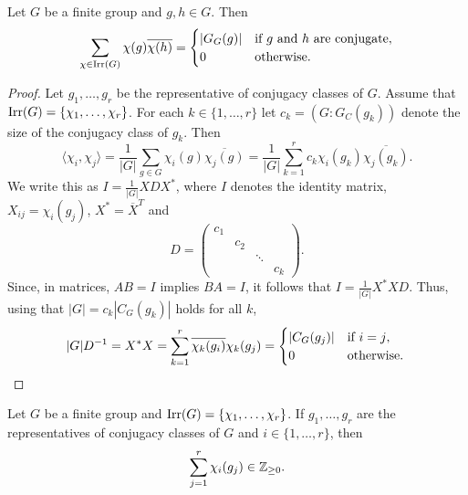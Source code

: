 \begin{theorem}[Schur]
    Let $G$ be a finite group and $g,h\in G$. 
    Then
    \[
    \sum_{\chi\in\operatorname{Irr}(G)}\chi(g)\overline{\chi(h)}
    =\begin{cases}
    |G_G(g)| & \text{if $g$ and $h$ are conjugate},\\
    0 & \text{otherwise}.
    \end{cases}
    \]
\end{theorem}

\begin{proof}
    Let $g_1,\dots,g_r$ be the representative of conjugacy classes of $G$. 
    Assume that $\operatorname{Irr}(G)=\{\chi_1,\dots,\chi_r\}$. For each $k\in\{1,\dots,r\}$ 
    let $c_k=(G:G_C(g_k))$ denote the size of the conjugacy class of $g_k$. Then
    \[
    \langle\chi_i,\chi_j\rangle
    =\frac{1}{|G|}\sum_{g\in G}\chi_i(g)\overline{\chi_j(g)}
    =\frac{1}{|G|}\sum_{k=1}^rc_k\chi_i(g_k)\overline{\chi_j(g_k)}.
    \]
    We write this as $I=\frac{1}{|G|}XDX^*$, where $I$ denotes the identity matrix, 
    $X_{ij}=\chi_i(g_j)$, 
    $X^*=\overline{X}^T$ and 
    \[
    D=\begin{pmatrix}
    c_1\\
    &c_2\\
    &&\ddots\\
    &&&c_k
    \end{pmatrix}.
    \]
    Since, in matrices, $AB=I$ implies $BA=I$, it follows that
    $I=\frac{1}{|G|}X^*XD$. Thus, using that $|G|=c_k|C_G(g_k)|$ 
    holds for all $k$, 
    \[
    |G|D^{-1}=X^*X=\sum_{k=1}^r\overline{\chi_k(g_i)}\chi_k(g_j)
    =\begin{cases}
    |C_G(g_j)| & \text{if $i=j$},\\
    0 & \text{otherwise}.
    \end{cases}\qedhere
    \]
\end{proof}

\begin{theorem}[Solomon]
    Let $G$ be a finite group and $\operatorname{Irr}(G)=\{\chi_1,\dots,\chi_r\}$. 
    If $g_1,\dots,g_r$ are the representatives of conjugacy classes
    of $G$ and $i\in\{1,\dots,r\}$, then 
    \[
    \sum_{j=1}^r\chi_i(g_j)\in\mathbb{Z}_{\geq0}.
    \]
\end{theorem}

